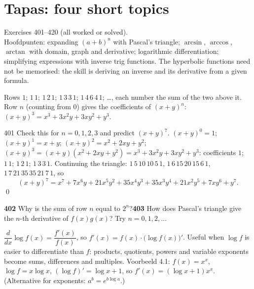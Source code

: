 \chapter{Tapas: four short topics}
%
{Exercises 401--420 (all worked or solved).\\ Hoofdpunten: expanding $(a+b)^n$ with Pascal's triangle; $\arcsin$, $\arccos$, $\arctan$ with domain, graph and derivative; logarithmic differentiation; simplifying expressions with inverse trig functions. The hyperbolic functions need not be memorised: the skill is deriving an inverse and its derivative from a given formula.}

\begin{key}[{\S4.1}]
Rows $1$; $1\,1$; $1\,2\,1$; $1\,3\,3\,1$; $1\,4\,6\,4\,1$; \dots, each number the sum of the two above it. Row $n$ (counting from $0$) gives the coefficients of $(x+y)^n$: $(x+y)^3=x^3+3x^2y+3xy^2+y^3$.
\end{key}

\begin{bookex}{401}
Check this for $n=0,1,2,3$ and predict $(x+y)^7$.
\solution
$(x+y)^0=1$; $(x+y)^1=x+y$; $(x+y)^2=x^2+2xy+y^2$; $(x+y)^3=(x+y)(x^2+2xy+y^2)=x^3+3x^2y+3xy^2+y^3$: coefficients $1$; $1\,1$; $1\,2\,1$; $1\,3\,3\,1$. Continuing the triangle: $1\,5\,10\,10\,5\,1$, $1\,6\,15\,20\,15\,6\,1$, $1\,7\,21\,35\,35\,21\,7\,1$, so
\[
(x+y)^7=x^7+7x^6y+21x^5y^2+35x^4y^3+35x^3y^4+21x^2y^5+7xy^6+y^7 .
\]\qed
\end{bookex}

\begin{trybox}[{402, 403}]
\textbf{402} Why is the sum of row $n$ equal to $2^n$?\quad \textbf{403} How does Pascal's triangle give the $n$-th derivative of $f(x)g(x)$? Try $n=0,1,2,\dots$
\end{trybox}

\begin{strategy}
$\dfrac d{dx}\log f(x)=\dfrac{f'(x)}{f(x)}$, so $f'(x)=f(x)\cdot\big(\log f(x)\big)'$. Useful when $\log f$ is easier to differentiate than $f$: products, quotients, powers and variable exponents become sums, differences and multiples. Voorbeeld 4.1: $f(x)=x^x$, $\log f=x\log x$, $(\log f)'=\log x+1$, so $f'(x)=(\log x+1)x^x$. (Alternative for exponents: $a^{b}=e^{b\log a}$.)
\end{strategy}

